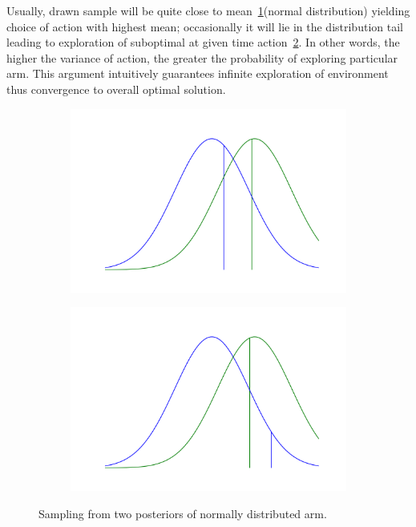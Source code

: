 \documentclass[12pt, a4paper, pdflatex, leqno]{report}
\begin{document}
Usually, drawn sample will be quite close to mean~\ref{fig:sim1}(normal distribution) yielding choice of action with highest mean; occasionally it will lie in the distribution tail leading to exploration of suboptimal at given time action~\ref{fig:sim2}. In other words, the higher the variance of action, the greater the probability of exploring particular arm. This argument intuitively guarantees infinite exploration of environment thus convergence to overall optimal solution.


\begin{figure}[htbp]
\centering
  \begin{subfigure}[b]{0.49\textwidth}
    \centering
    \includegraphics[width=0.99\linewidth]{graphics/sim1.png}
    \caption{\label{fig:sim1}}
  \end{subfigure}
  \begin{subfigure}[b]{0.49\textwidth}
    \centering
    \includegraphics[width=0.99\linewidth]{graphics/sim2.png}
    \caption{\label{fig:sim2}}
  \end{subfigure}
\begin{tiny}
\caption{Sampling from two posteriors of normally distributed arm.\label{fig:sim}}
\end{tiny}
\vspace{1cm}
\end{figure}
\end{document}
